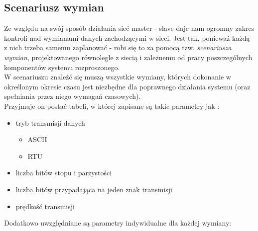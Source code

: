 	\subsection{Scenariusz wymian}
	Ze względu na swój sposób działania sieć master - slave daje nam ogromny zakres kontroli nad wymianami danych zachodzącymi w sieci. Jest tak, ponieważ każdą z nich trzeba samemu zaplanować - robi się to za pomocą tzw. \textit{scenariusza wymian}, projektowanego równolegle z siecią i zależnemu od pracy poszczególnych komponentów systemu rozproszonego.\\
	W scenariuszu znaleźć się muszą wszystkie wymiany, których dokonanie w określonym okresie czasu jest niezbędne dla poprawnego działania systemu (oraz spełniania przez niego wymagań czasowych).\\
	Przyjmuje on postać tabeli, w której zapisane są takie parametry jak :
	\begin{itemize}
		\item tryb transmisji danych
		\begin{itemize}
			\item ASCII
			\item RTU
		\end{itemize}
		\item liczba bitów stopu i parzystości
		\item liczba bitów przypadająca na jeden znak transmisji
		\item prędkość transmisji
	\end{itemize}
	Dodatkowo uwzględniane są parametry indywidualne dla każdej wymiany:
